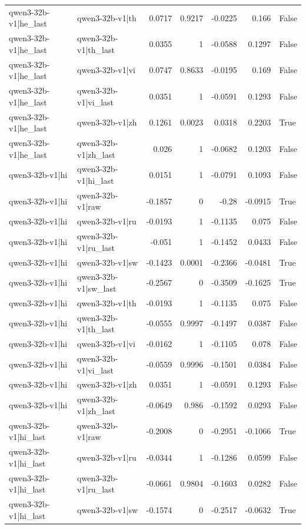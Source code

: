 \begin{table}
\begin{tabular}{l l r r r r l}
qwen3-32b-v1|he_last & qwen3-32b-v1|th & 0.0717 & 0.9217 & -0.0225 & 0.166 & False \\
qwen3-32b-v1|he_last & qwen3-32b-v1|th_last & 0.0355 & 1 & -0.0588 & 0.1297 & False \\
qwen3-32b-v1|he_last & qwen3-32b-v1|vi & 0.0747 & 0.8633 & -0.0195 & 0.169 & False \\
qwen3-32b-v1|he_last & qwen3-32b-v1|vi_last & 0.0351 & 1 & -0.0591 & 0.1293 & False \\
qwen3-32b-v1|he_last & qwen3-32b-v1|zh & 0.1261 & 0.0023 & 0.0318 & 0.2203 & True \\
qwen3-32b-v1|he_last & qwen3-32b-v1|zh_last & 0.026 & 1 & -0.0682 & 0.1203 & False \\
qwen3-32b-v1|hi & qwen3-32b-v1|hi_last & 0.0151 & 1 & -0.0791 & 0.1093 & False \\
qwen3-32b-v1|hi & qwen3-32b-v1|raw & -0.1857 & 0 & -0.28 & -0.0915 & True \\
qwen3-32b-v1|hi & qwen3-32b-v1|ru & -0.0193 & 1 & -0.1135 & 0.075 & False \\
qwen3-32b-v1|hi & qwen3-32b-v1|ru_last & -0.051 & 1 & -0.1452 & 0.0433 & False \\
qwen3-32b-v1|hi & qwen3-32b-v1|sw & -0.1423 & 0.0001 & -0.2366 & -0.0481 & True \\
qwen3-32b-v1|hi & qwen3-32b-v1|sw_last & -0.2567 & 0 & -0.3509 & -0.1625 & True \\
qwen3-32b-v1|hi & qwen3-32b-v1|th & -0.0193 & 1 & -0.1135 & 0.075 & False \\
qwen3-32b-v1|hi & qwen3-32b-v1|th_last & -0.0555 & 0.9997 & -0.1497 & 0.0387 & False \\
qwen3-32b-v1|hi & qwen3-32b-v1|vi & -0.0162 & 1 & -0.1105 & 0.078 & False \\
qwen3-32b-v1|hi & qwen3-32b-v1|vi_last & -0.0559 & 0.9996 & -0.1501 & 0.0384 & False \\
qwen3-32b-v1|hi & qwen3-32b-v1|zh & 0.0351 & 1 & -0.0591 & 0.1293 & False \\
qwen3-32b-v1|hi & qwen3-32b-v1|zh_last & -0.0649 & 0.986 & -0.1592 & 0.0293 & False \\
qwen3-32b-v1|hi_last & qwen3-32b-v1|raw & -0.2008 & 0 & -0.2951 & -0.1066 & True \\
qwen3-32b-v1|hi_last & qwen3-32b-v1|ru & -0.0344 & 1 & -0.1286 & 0.0599 & False \\
qwen3-32b-v1|hi_last & qwen3-32b-v1|ru_last & -0.0661 & 0.9804 & -0.1603 & 0.0282 & False \\
qwen3-32b-v1|hi_last & qwen3-32b-v1|sw & -0.1574 & 0 & -0.2517 & -0.0632 & True \\

\end{tabular}
\end{table}
